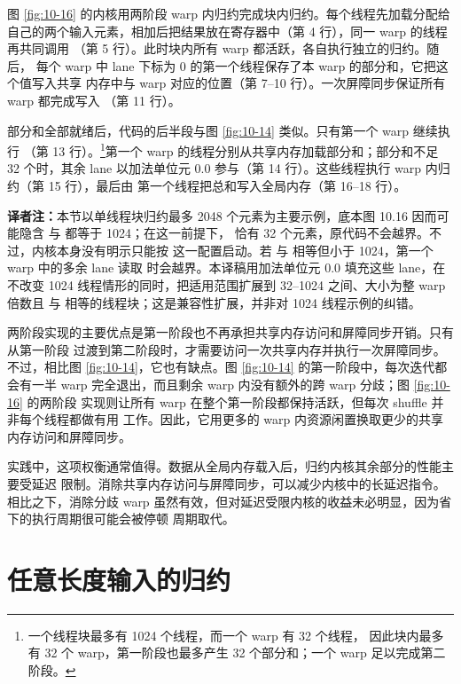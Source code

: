 图 \ref{fig:10-16} 的内核用两阶段 warp 内归约完成块内归约。每个线程先加载分配给
自己的两个输入元素，相加后把结果放在寄存器中（第 4 行），同一 warp 的线程再共同调用
（第 5 行）。此时块内所有 warp 都活跃，各自执行独立的归约。随后，
每个 warp 中 lane 下标为 0 的第一个线程保存了本 warp 的部分和，它把这个值写入共享
内存中与 warp 对应的位置（第 7--10 行）。一次屏障同步保证所有 warp 都完成写入
（第 11 行）。

部分和全部就绪后，代码的后半段与图 \ref{fig:10-14} 类似。只有第一个 warp 继续执行
（第 13 行）。\footnote{一个线程块最多有 1024 个线程，而一个 warp 有 32 个线程，
因此块内最多有 32 个 warp，第一阶段也最多产生 32 个部分和；一个 warp 足以完成第二
阶段。}第一个 warp 的线程分别从共享内存加载部分和；部分和不足 32 个时，其余 lane
以加法单位元 $0.0$ 参与（第 14 行）。这些线程执行 warp 内归约（第 15 行），最后由
第一个线程把总和写入全局内存（第 16--18 行）。

\noindent\textbf{译者注：}本节以单线程块归约最多 2048 个元素为主要示例，底本图
10.16 因而可能隐含  与  都等于 1024；在这一前提下，
 恰有 32 个元素，原代码不会越界。不过，内核本身没有明示只能按
这一配置启动。若  与  相等但小于 1024，第一个 warp
中的多余 lane 读取
 时会越界。本译稿用加法单位元 $0.0$ 填充这些 lane，在不改变
1024 线程情形的同时，把适用范围扩展到 32--1024 之间、大小为整 warp 倍数且
 与  相等的线程块；这是兼容性扩展，并非对 1024
线程示例的纠错。

两阶段实现的主要优点是第一阶段也不再承担共享内存访问和屏障同步开销。只有从第一阶段
过渡到第二阶段时，才需要访问一次共享内存并执行一次屏障同步。不过，相比图
\ref{fig:10-14}，它也有缺点。图 \ref{fig:10-14} 的第一阶段中，每次迭代都会有一半
warp 完全退出，而且剩余 warp 内没有额外的跨 warp 分歧；图 \ref{fig:10-16} 的两阶段
实现则让所有 warp 在整个第一阶段都保持活跃，但每次 shuffle 并非每个线程都做有用
工作。因此，它用更多的 warp 内资源闲置换取更少的共享内存访问和屏障同步。

实践中，这项权衡通常值得。数据从全局内存载入后，归约内核其余部分的性能主要受延迟
限制。消除共享内存访问与屏障同步，可以减少内核中的长延迟指令。相比之下，消除分歧
warp 虽然有效，但对延迟受限内核的收益未必明显，因为省下的执行周期很可能会被停顿
周期取代。

\section{任意长度输入的归约}
\label{sec:reduction-arbitrary-length}

